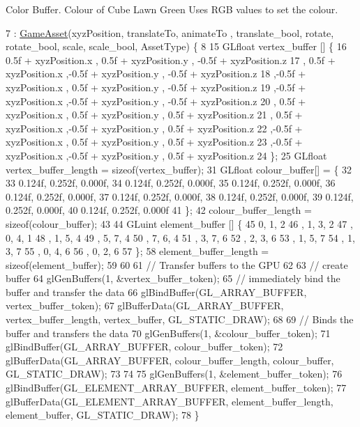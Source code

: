 Color Buffer. Colour of Cube Lawn Green Uses R\+G\+B values to set the colour.
\begin{DoxyCode}
7 : \hyperlink{class_game_asset_a9de932075d9b4263e7fb24fbfd163a61}{GameAsset}(xyzPosition, translateTo, animateTo , translate\_bool, rotate, rotate\_bool, scale, 
      scale\_bool, AssetType) \{
8   
15   GLfloat vertex\_buffer [] \{
16       0.5f + xyzPosition.x  , 0.5f + xyzPosition.y  , -0.5f + xyzPosition.z
17     , 0.5f + xyzPosition.x  ,-0.5f + xyzPosition.y  , -0.5f + xyzPosition.z
18     ,-0.5f + xyzPosition.x  , 0.5f + xyzPosition.y  , -0.5f + xyzPosition.z
19     ,-0.5f + xyzPosition.x  ,-0.5f + xyzPosition.y  , -0.5f + xyzPosition.z
20     , 0.5f + xyzPosition.x  , 0.5f + xyzPosition.y  ,  0.5f + xyzPosition.z
21     , 0.5f + xyzPosition.x  ,-0.5f + xyzPosition.y  ,  0.5f + xyzPosition.z
22     ,-0.5f + xyzPosition.x  , 0.5f + xyzPosition.y  ,  0.5f + xyzPosition.z
23     ,-0.5f + xyzPosition.x  ,-0.5f + xyzPosition.y  ,  0.5f + xyzPosition.z
24   \};
25   GLfloat vertex\_buffer\_length = \textcolor{keyword}{sizeof}(vertex\_buffer);
31   GLfloat colour\_buffer[] = \{
32 
33      0.124f, 0.252f, 0.000f,
34      0.124f, 0.252f, 0.000f,
35      0.124f, 0.252f, 0.000f,
36      0.124f, 0.252f, 0.000f,
37      0.124f, 0.252f, 0.000f,
38      0.124f, 0.252f, 0.000f,
39      0.124f, 0.252f, 0.000f,
40      0.124f, 0.252f, 0.000f
41   \};
42   colour\_buffer\_length = \textcolor{keyword}{sizeof}(colour\_buffer);
43   
44   GLuint element\_buffer []  \{
45       0, 1, 2   
46     , 1, 3, 2
47     , 0, 4, 1   
48     , 1, 5, 4   
49     , 5, 7, 4   
50     , 7, 6, 4   
51     , 3, 7, 6   
52     , 2, 3, 6   
53     , 1, 5, 7   
54     , 1, 3, 7   
55     , 0, 4, 6   
56     , 0, 2, 6   
57   \};
58   element\_buffer\_length = \textcolor{keyword}{sizeof}(element\_buffer);
59 
60 
61   \textcolor{comment}{// Transfer buffers to the GPU}
62 
63   \textcolor{comment}{// create buffer}
64   glGenBuffers(1, &vertex\_buffer\_token);
65   \textcolor{comment}{// immediately bind the buffer and transfer the data}
66   glBindBuffer(GL\_ARRAY\_BUFFER, vertex\_buffer\_token);
67   glBufferData(GL\_ARRAY\_BUFFER, vertex\_buffer\_length, vertex\_buffer, GL\_STATIC\_DRAW);
68 
69   \textcolor{comment}{// Binds the buffer and transfers the data}
70   glGenBuffers(1, &colour\_buffer\_token);
71   glBindBuffer(GL\_ARRAY\_BUFFER, colour\_buffer\_token);
72   glBufferData(GL\_ARRAY\_BUFFER, colour\_buffer\_length, colour\_buffer, GL\_STATIC\_DRAW);
73 
74 
75   glGenBuffers(1, &element\_buffer\_token);
76   glBindBuffer(GL\_ELEMENT\_ARRAY\_BUFFER, element\_buffer\_token);
77   glBufferData(GL\_ELEMENT\_ARRAY\_BUFFER, element\_buffer\_length, element\_buffer, GL\_STATIC\_DRAW);
78 \}
\end{DoxyCode}
\hypertarget{class_ground_asset_a8f607f3cabded6280c5a5eb2cbfa8c79}{}
